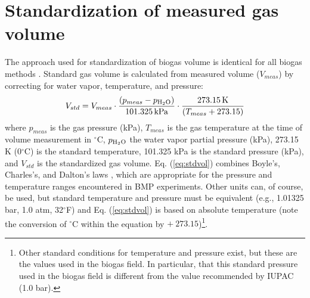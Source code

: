 \documentclass[]{article}
\newcommand{\unit}[1]{\ensuremath{\, \mathrm{#1}}}
\begin{document}
\section{Standardization of measured gas volume}
The approach used for standardization of biogas volume is identical for all biogas methods \citep{BMPdoc202man, BMPdoc204gasdens, BMPdoc201vol, BMPdoc203grav}.
Standard gas volume is calculated from measured volume ($V_{meas}$) by correcting for water vapor, temperature, and pressure:
\begin{equation}
  \label{eq:stdvol}
  V_{std} = V_{meas} \cdot \frac{(p_{meas} - p\textsubscript{H$_2$O})} {101.325 \unit{kPa}} \cdot \frac {273.15 \unit{K}}{(T_{meas} + 273.15)}
\end{equation}
where $p_{meas}$ is the gas pressure (kPa), $T_{meas}$ is the gas temperature at the time of volume measurement in $^\circ$C, $p\textsubscript{H$_2$O}$ the water vapor partial pressure (kPa), 273.15 K (0$^\circ$C) is the standard temperature, 101.325 kPa is the standard pressure (kPa), and $V_{std}$ is the standardized gas volume.
Eq. (\ref{eq:stdvol}) combines Boyle's, Charles's, and Dalton's laws \citep{negiTextbookPhysicalChemistry1985}, which are appropriate for the pressure and temperature ranges encountered in BMP experiments.
Other units can, of course, be used, but standard temperature and pressure must be equivalent (e.g., 1.01325 bar, 1.0 atm, 32$^\circ$F) and Eq. (\ref{eq:stdvol}) is based on absolute temperature (note the conversion of $^\circ$C within the equation by $+~273.15$)\footnote{
  Other standard conditions for temperature and pressure exist, but these are the values used in the biogas field.
  In particular, that this standard pressure used in the biogas field is different from the value recommended by IUPAC (1.0 bar).
}.
\end{document}
